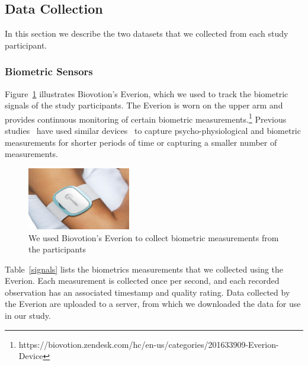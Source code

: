 \subsection{Data Collection}

In this section we describe the two datasets that we collected from each study participant.

\subsubsection{Biometric Sensors}
Figure~\ref{everion} illustrates Biovotion's Everion, which we used to track the biometric signals of the study participants. The Everion is worn on the upper arm and provides continuous monitoring of certain biometric measurements.\footnote{https://biovotion.zendesk.com/hc/en-us/categories/201633909-Everion-Device} Previous studies~\cite{zuger18,sano2013stress,healey2005detecting,wijsman2011towards,zuger2015interruptibility,goyal2017intelligent} have used similar devices~\cite{Okada11,polar,fitbitCharge} to capture psycho-physiological and biometric measurements for shorter periods of time or capturing a smaller number of measurements.

\begin{figure}
  \centering
      \includegraphics[width=0.4\textwidth]{Everion.jpg}
  \caption{We used Biovotion's Everion to collect biometric measurements from the participants}
   \label{everion}
\end{figure}

Table~\ref{signals} lists the biometrics measurements that we collected using the Everion. Each measurement is collected once per second, and each recorded observation has an associated timestamp and quality rating. Data collected by the Everion are uploaded to a server, from which we downloaded the data for use in our study.

